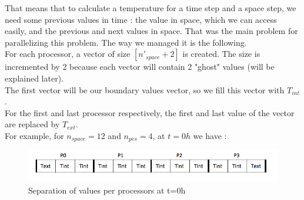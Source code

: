 \documentclass{article}
\begin{document}
            That means that to calculate a temperature for a time step and a space
            step, we need some previous values in time : the value in space, 
            which we can access easily, and the previous and next values in space.
            That was the main problem for parallelizing this problem. The way we managed
            it is the following.\\
            For each processor, a vector of size $[n'_{space} + 2]$ is created. The size is incremented
            by 2 because each vector will contain 2 "ghost" values (will be explained later).\\
            The first vector will be our boundary values vector, so we fill this vector
            with $T_{int}$.\\
            For the first and last processor respectively, the first and last value of the vector are
            replaced by $T_{ext}$.\\
            For example, for $n_{space} = 12$ and $n_{pes} = 4$, at $t=0h$ we have :
            \begin{figure}[H]
                \includegraphics[width=\textwidth]{separation.png}
                \caption{Separation of values per processors at t=0h}
            \end{figure}
\end{document}

